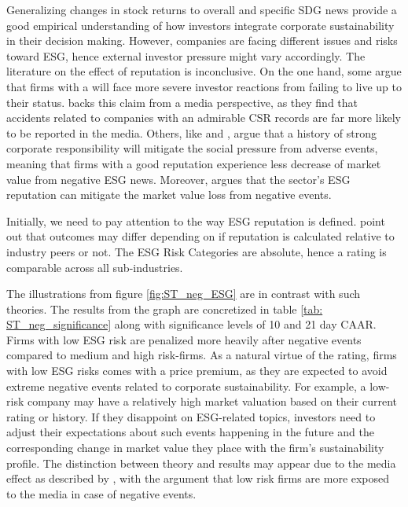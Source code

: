 Generalizing changes in stock returns to overall and specific SDG news provide a good empirical understanding of how investors integrate corporate sustainability in their decision making. However, companies are facing different issues and risks toward ESG, hence external investor pressure might vary accordingly. 
The literature on the effect of reputation is inconclusive. On the one hand, some argue that firms with a  will face more severe investor reactions from failing to live up to their status. \cite{noNewsgoodnews} backs this claim from a media perspective, as they find that accidents related to companies with an admirable CSR records are far more likely to be reported in the media. Others, like \cite{flammer2013corporate} and \cite{godfrey2009relationship}, argue that a history of strong corporate responsibility will mitigate the social pressure from adverse events, meaning that firms with a good reputation experience less decrease of market value from negative ESG news. Moreover, \cite{Blancard_ESG_sentiment} argues that the sector's ESG reputation can mitigate the market value loss from negative events.  

Initially, we need to pay attention to the way ESG reputation is defined. \cite{rennings2007effect} point out that outcomes may differ depending on if reputation is calculated relative to industry peers or not. The ESG Risk Categories are absolute, hence a rating is comparable across all sub-industries. 

The illustrations from figure \ref{fig:ST_neg_ESG} are in contrast with such theories. The results from the graph are concretized in table \ref{tab: ST_neg_significance} along with significance levels of 10 and 21 day CAAR. Firms with low ESG risk are penalized more heavily after negative events compared to medium and high risk-firms. As a natural virtue of the rating, firms with low ESG risks comes with a price premium, as they are expected to avoid extreme negative events related to corporate sustainability. For example, a low-risk company may have a relatively high market valuation based on their current rating or history. If they disappoint on ESG-related topics, investors need to adjust their expectations about such events happening in the future and the corresponding change in market value they place with the firm's sustainability profile. The distinction between theory and results may appear due to the media effect as described by \cite{noNewsgoodnews}, with the argument that low risk firms are more exposed to the media in case of negative events. 

